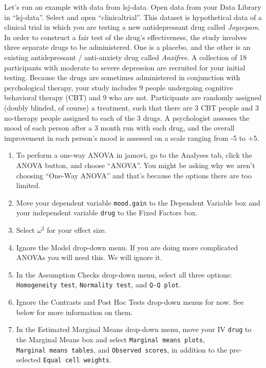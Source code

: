 \documentclass[
]{book}
\begin{document}
Let's run an example with data from lsj-data. Open data from your Data Library in ``lsj-data''. Select and open ``clinicaltrial''. This dataset is hypothetical data of a clinical trial in which you are testing a new antidepressant drug called \emph{Joyzepam}. In order to construct a fair test of the drug's effectiveness, the study involves three separate drugs to be administered. One is a placebo, and the other is an existing antidepressant / anti-anxiety drug called \emph{Anxifree}. A collection of 18 participants with moderate to severe depression are recruited for your initial testing. Because the drugs are sometimes administered in conjunction with psychological therapy, your study includes 9 people undergoing cognitive behavioral therapy (CBT) and 9 who are not. Participants are randomly assigned (doubly blinded, of course) a treatment, such that there are 3 CBT people and 3 no-therapy people assigned to each of the 3 drugs. A psychologist assesses the mood of each person after a 3 month run with each drug, and the overall improvement in each person's mood is assessed on a scale ranging from -5 to +5.

\begin{enumerate}
\def\labelenumi{\arabic{enumi}.}
\item
  To perform a one-way ANOVA in jamovi, go to the Analyses tab, click the ANOVA button, and choose ``ANOVA''. You might be asking why we aren't choosing ``One-Way ANOVA'' and that's because the options there are too limited.
\item
  Move your dependent variable \texttt{mood.gain} to the Dependent Variable box and your independent variable \texttt{drug} to the Fixed Factors box.
\item
  Select \(\omega^2\) for your effect size.
\item
  Ignore the Model drop-down menu. If you are doing more complicated ANOVAs you will need this. We will ignore it.
\item
  In the Assumption Checks drop-down menu, select all three options: \texttt{Homogeneity\ test}, \texttt{Normality\ test}, and \texttt{Q-Q\ plot}.
\item
  Ignore the Contrasts and Post Hoc Tests drop-down menus for now. See below for more information on them.
\item
  In the Estimated Marginal Means drop-down menu, move your IV \texttt{drug} to the Marginal Means box and select \texttt{Marginal\ means\ plots}, \texttt{Marginal\ means\ tables}, and \texttt{Observed\ scores}, in addition to the pre-selected \texttt{Equal\ cell\ weights}.
\end{enumerate}
\end{document}
